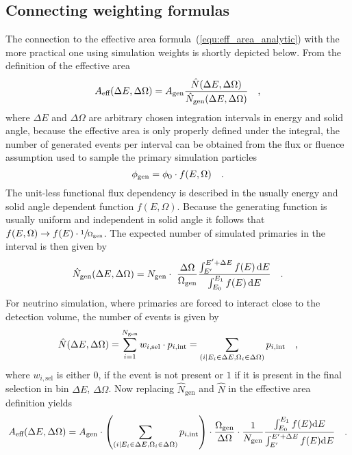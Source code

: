 \subsection{Connecting weighting formulas}
The connection to the effective area formula~(\ref{equ:eff_area_analytic}) with the more practical one using simulation weights is shortly depicted below.
From the definition of the effective area
\begin{equation}
  A_\text{eff}(\Delta E, \Delta \Omega) =
    A_\text{gen} \frac{\hat{N}(\Delta E, \Delta \Omega)}
                      {\hat{N}_\text{gen}(\Delta E, \Delta \Omega)}
  \quad\text{,}
\end{equation}
where $\Delta E$ and $\Delta \Omega$ are arbitrary chosen integration intervals in energy and solid angle, because the effective area is only properly defined under the integral, the number of generated events per interval can be obtained from the flux or fluence assumption used to sample the primary simulation particles
\begin{equation}
  \phi_\text{gen} = \phi_0 \cdot f(E, \Omega)
  \quad\text{.}
\end{equation}
The unit-less functional flux dependency is described in the usually energy and solid angle dependent function $f(E, \Omega)$.
Because the generating function is usually uniform and independent in solid angle it follows that $f(E, \Omega) \rightarrow f(E)\cdot \sfrac{1}{\Omega_\text{gen}}$.
The expected number of simulated primaries in the interval is then given by
\begin{equation}
  \hat{N}_\text{gen}(\Delta E, \Delta\Omega) =
    N_\text{gen} \cdot \frac{\Delta\Omega}{\Omega_\text{gen}}
    \frac{\int_{E'}^{E'+\Delta E} f(E) \,\d{E}}
         {\int_{E_0}^{E_1} f(E) \,\d{E}}
  \mperiod
\end{equation}
For neutrino simulation, where primaries are forced to interact close to the detection volume, the number of events is given by
\begin{equation}
  \hat{N}(\Delta E, \Delta \Omega)
  = \sum_{i=1}^{N_\text{gen}} w_{i,\text{sel}}\cdot p_{i,\text{int}}
  = \sum_{(i|E_i\in\Delta E, \Omega_i\in\Delta\Omega)} p_{i,\text{int}}
  \quad\text{,}
\end{equation}
where $w_{i,\text{sel}}$ is either $0$, if the event is not present or $1$ if it is present in the final selection in bin $\Delta E$, $\Delta \Omega$.
Now replacing $\hat{N}_\text{gen}$ and $\hat{N}$ in the effective area definition yields
\begin{equation}
  A_\text{eff}(\Delta E, \Delta \Omega) =
    A_\text{gen} \cdot
    \left(\sum_{(i|E_i\in\Delta E, \Omega_i\in\Delta\Omega)}
          p_{i,\text{int}}\right) \cdot
    \frac{\Omega_\text{gen}}{\Delta\Omega} \cdot \frac{1}{N_\text{gen}}
    \frac{\int_{E_0}^{E_1} f(E) \mathrm{d}E}
         {\int_{E'}^{E'+\Delta E} f(E) \mathrm{d}E}
  \quad\text{.}
\end{equation}
